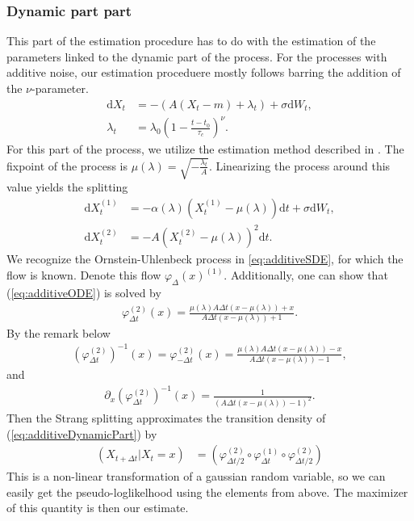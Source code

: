 \subsubsection{Dynamic part part}\label{subsubsec:OUprocessDynamic}
This part of the estimation procedure has to do with the estimation of the parameters linked to the dynamic part of the process. For the processes with additive noise, our estimation proceduere mostly follows \cite{Ditlevsen2023} barring the addition of the $\nu$-parameter.
\begin{align}
    \mathrm{d}X_t &= -\left(A\left(X_t - m\right) + \lambda_t\right) + \sigma \mathrm{d}W_t \label{eq:additiveDynamicPart},\\
    \lambda_t &= \lambda_0\left(1 - \frac{t - t_0}{\tau_c}\right)^\nu.
\end{align}
For this part of the process, we utilize the estimation method described in \cite{DitlevsenSupplementary}. The fixpoint of the process is $\mu\left(\lambda\right) = \sqrt{-\frac{\lambda_t}{A}}$. Linearizing the process around this value yields the splitting
\begin{align}
    \mathrm{d}X_t^{(1)} &= -\alpha\left(\lambda\right)\left(X_t^{(1)} - \mu\left(\lambda\right)\right)\mathrm{d}t + \sigma \mathrm{d}W_t, \label{eq:additiveSDE}\\
    \mathrm{d}X_t^{(2)} &= -A \left(X_t^{(2)} - \mu\left(\lambda\right)\right)^2\mathrm{d}t. \label{eq:additiveODE}
\end{align}
We recognize the Ornstein-Uhlenbeck process in \ref{eq:additiveSDE}, for which the flow is known. Denote this flow $\varphi_\Delta(x)^{(1)}$. Additionally, one can show that (\ref{eq:additiveODE}) is solved by 
\begin{align}
    \varphi^{(2)}_{\Delta t}(x) = \frac{\mu\left(\lambda\right)A\Delta t\left(x - \mu\left(\lambda\right)\right) + x}{A\Delta t\left(x- \mu\left(\lambda\right)\right) + 1}.
\end{align}
By the remark below \cite[equation 9]{SplittingSchemes} 
\begin{align}
    \left(\varphi^{(2)}_{\Delta t}\right)^{-1}(x) = \varphi^{(2)}_{-\Delta t}(x) = \frac{\mu\left(\lambda\right)A\Delta t\left(x - \mu\left(\lambda\right)\right) - x}{A\Delta t\left(x- \mu\left(\lambda\right)\right) - 1},
\end{align}
and 
\begin{align}
    \partial_x \left(\varphi^{(2)}_{\Delta t}\right)^{-1}(x) = \frac{1}{\left(A \Delta t\left(x-\mu\left(\lambda \right)\right) - 1\right)^2}.
\end{align}
Then the Strang splitting approximates the transition density of (\ref{eq:additiveDynamicPart}) by
\begin{align}
    \left(X_{t + \Delta t} | X_t = x\right) &= \left(\varphi^{(2)}_{\Delta t / 2}\circ \varphi^{(1)}_{\Delta t} \circ \varphi^{(2)}_{\Delta t / 2}\right)
\end{align}
This is a non-linear transformation of a gaussian random variable, so we can easily get the pseudo-loglikelhood using the elements from above. The maximizer of this quantity is then our estimate. 
